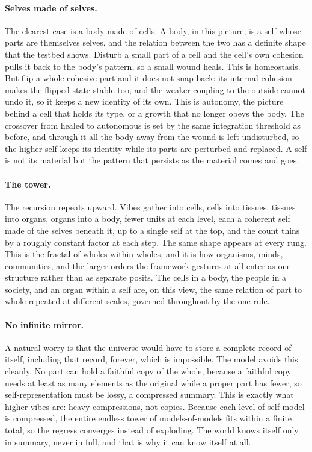 \paragraph{Selves made of selves.}
The clearest case is a body made of cells. A body, in this picture, is a self whose parts are
themselves selves, and the relation between the two has a definite shape that the testbed shows.
Disturb a small part of a cell and the cell's own cohesion pulls it back to the body's pattern,
so a small wound heals. This is homeostasis. But flip a whole cohesive part and it does not snap
back: its internal cohesion makes the flipped state stable too, and the weaker coupling to the
outside cannot undo it, so it keeps a new identity of its own. This is autonomy, the picture
behind a cell that holds its type, or a growth that no longer obeys the body. The crossover from
healed to autonomous is set by the same integration threshold as before, and through it all the
body away from the wound is left undisturbed, so the higher self keeps its identity while its
parts are perturbed and replaced. A self is not its material but the pattern that persists as
the material comes and goes.

\paragraph{The tower.}
The recursion repeats upward. Vibes gather into cells, cells into tissues, tissues into organs,
organs into a body, fewer units at each level, each a coherent self made of the selves beneath
it, up to a single self at the top, and the count thins by a roughly constant factor at each
step. The same shape appears at every rung. This is the fractal of wholes-within-wholes, and it
is how organisms, minds, communities, and the larger orders the framework gestures at all enter
as one structure rather than as separate posits. The cells in a body, the people in a society,
and an organ within a self are, on this view, the same relation of part to whole repeated at
different scales, governed throughout by the one rule.

\paragraph{No infinite mirror.}
A natural worry is that the universe would have to store a complete record of itself, including
that record, forever, which is impossible. The model avoids this cleanly. No part can hold a
faithful copy of the whole, because a faithful copy needs at least as many elements as the
original while a proper part has fewer, so self-representation must be lossy, a compressed
summary. This is exactly what higher vibes are: heavy compressions, not copies. Because each
level of self-model is compressed, the entire endless tower of models-of-models fits within a
finite total, so the regress converges instead of exploding. The world knows itself only in
summary, never in full, and that is why it can know itself at all.

